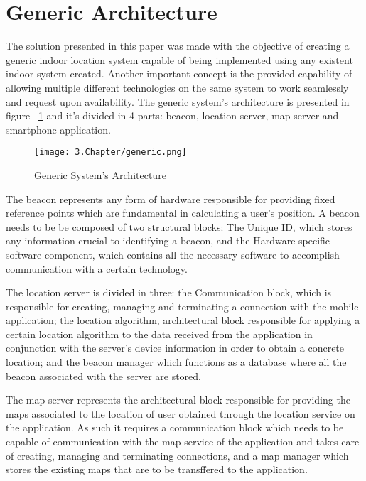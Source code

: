 \section{Generic Architecture}
\label{sec:generic}


The solution presented in this paper was made with the objective of creating a generic indoor location system capable of being implemented using any existent indoor system created. Another important concept is the provided capability of allowing multiple different technologies on the same system to work seamlessly and request upon availability. The generic system's architecture is presented in figure ~\ref{fig:generic} and it's divided in 4 parts: beacon, location server, map server and smartphone application. 

\begin{figure}
	\centering
		\texttt{[image: 3.Chapter/generic.png]}
	\caption[Generic System's Architecture]{Generic System's Architecture}
	\label{fig:generic}
\end{figure}

The beacon represents any form of hardware responsible for providing fixed reference points which are fundamental in calculating a user's position. A beacon needs to be be composed of two structural blocks: The Unique ID, which stores any information crucial to identifying a beacon, and the Hardware specific software component, which contains all the necessary software to accomplish communication with a certain technology. 

The location server is divided in three: the Communication block, which is responsible for creating, managing and terminating a connection with the mobile application; the location algorithm, architectural block responsible for applying a certain location algorithm to the data received from the application in conjunction with the server's device information in order to obtain a concrete location; and the beacon manager which functions as a database where all the beacon associated with the server are stored.

The map server represents the architectural block responsible for providing the maps associated to the location of user obtained through the location service on the application. As such it requires a communication block which needs to be capable of communication with the map service of the application and takes care of creating, managing and terminating connections, and a map manager which stores the existing maps that are to be transffered to the application.

